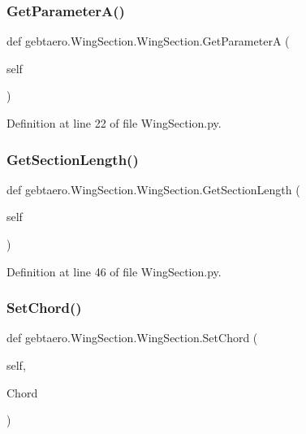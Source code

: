 \subsubsection{\texorpdfstring{Get\+Parameter\+A()}{GetParameterA()}}
{\footnotesize\ttfamily def gebtaero.\+Wing\+Section.\+Wing\+Section.\+Get\+ParameterA (\begin{DoxyParamCaption}\item[{}]{self }\end{DoxyParamCaption})}



Definition at line 22 of file Wing\+Section.\+py.

\mbox{\label{classgebtaero_1_1_wing_section_1_1_wing_section_a55b1955062f73aea55c508427f9491bf}} 
\subsubsection{\texorpdfstring{Get\+Section\+Length()}{GetSectionLength()}}
{\footnotesize\ttfamily def gebtaero.\+Wing\+Section.\+Wing\+Section.\+Get\+Section\+Length (\begin{DoxyParamCaption}\item[{}]{self }\end{DoxyParamCaption})}



Definition at line 46 of file Wing\+Section.\+py.

\mbox{\label{classgebtaero_1_1_wing_section_1_1_wing_section_a8371272d51d0381a5a39213aee9b1814}} 
\subsubsection{\texorpdfstring{Set\+Chord()}{SetChord()}}
{\footnotesize\ttfamily def gebtaero.\+Wing\+Section.\+Wing\+Section.\+Set\+Chord (\begin{DoxyParamCaption}\item[{}]{self,  }\item[{}]{Chord }\end{DoxyParamCaption})}



